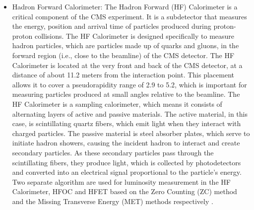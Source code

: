 \begin{itemize}

\item Hadron Forward Calorimeter: The Hadron Forward (HF) Calorimeter is a critical component of the CMS experiment. It is a subdetector that measures the energy, position and arrival time of particles produced during proton-proton collisions. The HF Calorimeter is designed specifically to measure hadron particles, which are particles made up of quarks and gluons, in the forward region (i.e., close to the beamline) of the CMS detector. The HF Calorimeter is located at the very front and back of the CMS detector, at a distance of about 11.2 meters from the interaction point. This placement allows it to cover a pseudorapidity range of 2.9 to 5.2, which is important for measuring particles produced at small angles relative to the beamline. The HF Calorimeter is a sampling calorimeter, which means it consists of alternating layers of active and passive materials. The active material, in this case, is scintillating quartz fibers, which emit light when they interact with charged particles. The passive material is steel absorber plates, which serve to initiate hadron showers, causing the incident hadron to interact and create secondary particles. As these secondary particles pass through the scintillating fibers, they produce light, which is collected by photodetectors and converted into an electrical signal proportional to the particle's energy. Two separate algorithm are used for luminosity measurement in the HF Calorimeter, HFOC and HFET based on the Zero Counting (ZC) method and the Missing Transverse Energy (MET) methods respectively \cite{CMS-PAS-LUM-15-001}. 


\end{itemize}

